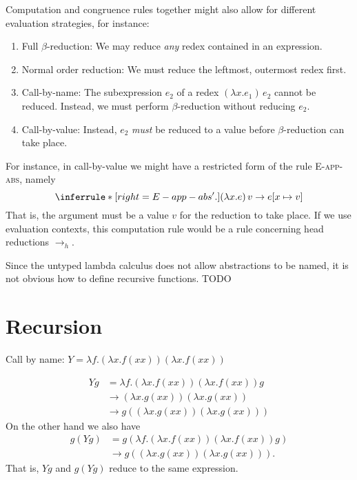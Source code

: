 \documentclass[a4paper, 11pt, article, danish, oneside]{memoir}
\newcommand{\infrule}[1]{{\normalfont\textsc{#1}}}
\newcommand{\step}{\to}
\newcommand{\headstep}{\to_h}
\begin{document}
Computation and congruence rules together might also allow for different evaluation strategies, for instance:
%
\begin{enumerate}
    \item Full $\beta$-reduction: We may reduce \emph{any} redex contained in an expression.

    \item Normal order reduction: We must reduce the leftmost, outermost redex first.

    \item Call-by-name: The subexpression $e_2$ of a redex $(\lambda x . e_1) \, e_2$ cannot be reduced. Instead, we must perform $\beta$-reduction without reducing $e_2$.

    \item Call-by-value: Instead, $e_2$ \emph{must} be reduced to a value before $\beta$-reduction can take place.
\end{enumerate}
%
For instance, in call-by-value we might have a restricted form of the rule \infrule{E-app-abs}, namely
%
\begin{equation*}
    \inferrule*[right=E-app-abs'.]{ }{
        (\lambda x . e) \, v \step e[x \mapsto v]
    }
\end{equation*}
%
That is, the argument must be a value $v$ for the reduction to take place. If we use evaluation contexts, this computation rule would be a rule concerning head reductions $\headstep$.


Since the untyped lambda calculus does not allow abstractions to be named, it is not obvious how to define recursive functions. TODO


\section{Recursion}

Call by name: $Y = \lambda f . (\lambda x . f (xx)) (\lambda x . f (xx))$

\begin{align*}
    Y g
        &= \lambda f . (\lambda x . f (xx)) (\lambda x . f (xx)) g \\
        &\step (\lambda x . g (xx)) (\lambda x . g (xx)) \\
        &\step g ((\lambda x . g (xx))(\lambda x . g (xx)))
\end{align*}
%
On the other hand we also have
%
\begin{align*}
    g (Y g)
        &= g (\lambda f . (\lambda x . f (xx)) (\lambda x . f (xx)) g) \\
        &\step g ((\lambda x . g (xx))(\lambda x . g (xx))).
\end{align*}
%
That is, $Y g$ and $g (Y g)$ reduce to the same expression.
\end{document}
